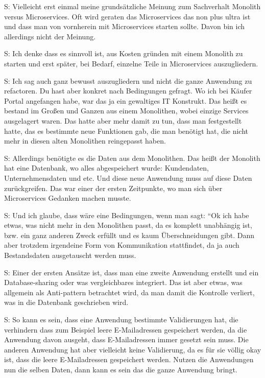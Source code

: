 S: Vielleicht erst einmal meine grundsätzliche Meinung zum Sachverhalt Monolith versus Microservices. Oft wird geraten das Microservices das non plus ultra ist und dass man von vornherein mit Microservices starten sollte. Davon bin ich allerdings nicht der Meinung.

S: Ich denke dass es sinnvoll ist, aus Kosten gründen mit einem Monolith zu starten und erst später, bei Bedarf, einzelne Teile in Microservices auszugliedern. 

S: Ich sag auch ganz bewusst auszugliedern und nicht die ganze Anwendung zu refactoren. Du hast aber konkret nach Bedingungen gefragt. Wo ich bei Käufer Portal angefangen habe, war das ja ein gewaltiges IT Konstrukt. Das heißt es bestand im Großen und Ganzen aus einem Monolithen, wobei einzige Services ausgelagert waren. Das hatte aber mehr damit zu tun, dass man festgestellt hatte, das es bestimmte neue Funktionen gab, die man benötigt hat, die nicht mehr in diesen alten Monolithen reingepasst haben. 

S: Allerdings benötigte es die Daten aus dem Monolithen. Das heißt der Monolith hat eine Datenbank, wo alles abgespeichert wurde: Kundendaten, Unternehmensdaten und etc. Und diese neue Anwendung muss auf diese Daten zurückgreifen. Das war einer der ersten Zeitpunkte, wo man sich über Microservices Gedanken machen musste.

S: Und ich glaube, dass wäre eine Bedingungen, wenn man sagt: “Ok ich habe etwas, was nicht mehr in den Monolithen passt, da es komplett unabhängig ist, bzw. ein ganz anderen Zweck erfüllt und es kaum Überschneidungen gibt. Dann aber trotzdem irgendeine Form von Kommunikation stattfindet, da ja auch Bestandsdaten ausgetauscht werden muss.

S: Einer der ersten Ansätze ist, dass man eine zweite Anwendung erstellt und ein Database-sharing oder was vergleichbares integriert. Das ist aber etwas, was allgemein als Anti-pattern betrachtet wird, da man damit die Kontrolle verliert, was in die Datenbank geschrieben wird.

S: So kann es sein, dass eine Anwendung bestimmte Validierungen hat, die verhindern dass zum Beispiel leere E-Mailadressen gespeichert werden, da die Anwendung davon ausgeht, dass E-Mailadressen immer gesetzt sein muss. Die anderen Anwendung hat aber vielleicht keine Validierung, da es für sie völlig okay ist, dass die leere E-Mailadressen gespeichert werden. Nutzen die Anwendungen nun die selben Daten, dann kann es sein das die ganze Anwendung bringt.

